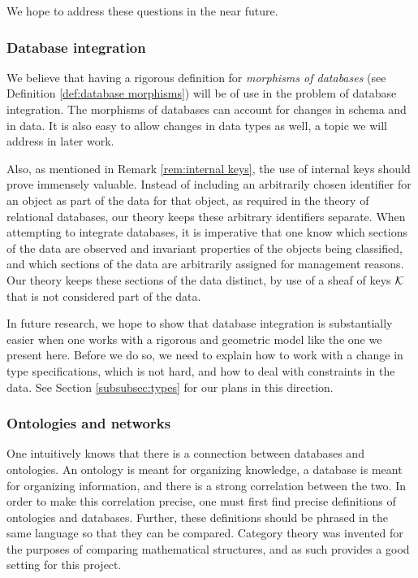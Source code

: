 \documentclass{amsart}
\begin{document}
We hope to address these questions in the near future.

\subsubsection{Database integration}

We believe that having a rigorous definition for {\em morphisms of databases} (see Definition \ref{def:database morphisms}) will be of use in the problem of database integration.  The morphisms of databases can account for changes in schema and in data.  It is also easy to allow changes in data types as well, a topic we will address in later work.

Also, as mentioned in Remark \ref{rem:internal keys}, the use of internal keys should prove immensely valuable.  Instead of including an arbitrarily chosen identifier for an object as part of the data for that object, as required in the theory of relational databases, our theory keeps these arbitrary identifiers separate.  When attempting to integrate databases, it is imperative that one know which sections of the data are observed and invariant properties of the objects being classified, and which sections of the data are arbitrarily assigned for management reasons.  Our theory keeps these sections of the data distinct, by use of a sheaf of keys $\mathcal{K}$ that is not considered part of the data.

In future research, we hope to show that database integration is substantially easier when one works with a rigorous and geometric model like the one we present here.  Before we do so, we need to explain how to work with a change in type specifications, which is not hard, and how to deal with constraints in the data.  See Section \ref{subsubsec:types} for our plans in this direction.

\subsubsection{Ontologies and networks}

One intuitively knows that there is a connection between databases and ontologies.  An ontology is meant for organizing knowledge, a database is meant for organizing information, and there is a strong correlation between the two.  In order to make this correlation precise, one must first find precise definitions of ontologies and databases.  Further, these definitions should be phrased in the same language so that they can be compared.  Category theory was invented for the purposes of comparing mathematical structures, and as such provides a good setting for this project.
\end{document}
